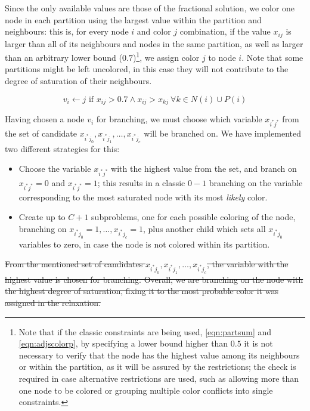 Since the only available values are those of the fractional solution, we color one node in each partition using the largest value within the partition and neighbours: this is, for every node $i$ and color $j$ combination, if the value $x_{ij}$ is larger than all of its neighbours and nodes in the same partition, as well as larger than an arbitrary lower bound ($0.7$)\footnote{Note that if the classic constraints are being used, \ref{eqn:partsum} and \ref{eqn:adjscolorp}, by specifying a lower bound higher than $0.5$ it is not necessary to verify that the node has the highest value among its neighbours or within the partition, as it will be assured by the restrictions; the check is required in case alternative restrictions are used, such as allowing more than one node to be colored or grouping multiple color conflicts into single constraints.}, we assign color $j$ to node $i$. Note that some partitions might be left uncolored, in this case they will not contribute to the degree of saturation of their neighbours.

\begin{equation}
\label{eqn:fixcriteria}
v_i \leftarrow j \text{ if } x_{ij} > 0.7 \wedge x_{ij} > x_{kj}\ \forall k \in N(i) \cup P(i)
\end{equation}

\begin{nuevo}
Having chosen a node $v_i$ for branching, we must choose which variable $x_{i^*j^*}$ from the set of candidate $x_{i^*j_0}, x_{i^*j_1}, \ldots, x_{i^*j_c}$ will be branched on. We have implemented two different strategies for this:
\begin{itemize}
	\item{Choose the variable $x_{i^*j^*}$ with the highest value from the set, and branch on $x_{i^*j^*} = 0$ and $x_{i^*j^*} = 1$; this results in a classic $0-1$ branching on the variable corresponding to the most saturated node with its most \textit{likely} color.}
	\item{Create up to $C+1$ subproblems, one for each possible coloring of the node, branching on $x_{i^*j_0} = 1, \ldots, x_{i^*j_c} = 1$, plus another child which sets all $x_{i^*j_0}$ variables to zero, in case the node is not colored within its partition.}
\end{itemize}
\end{nuevo}

\sout{
From the mentioned set of candidates $x_{i^*j_0}, x_{i^*j_1}, \ldots, x_{i^*j_c}$, the variable with the highest value is chosen for branching. Overall, we are branching on the node with the highest degree of saturation, fixing it to the most probable color it was assigned in the relaxation.
}

